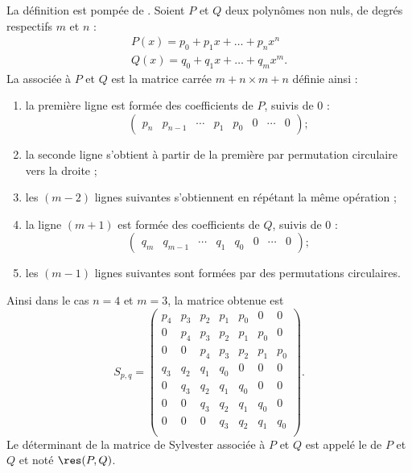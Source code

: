 La définition est pompée de . Soient \( P\) et \( Q\) deux polynômes non nuls, de degrés respectifs \( m\) et \( n\) :
\begin{subequations}
    \begin{align}
        P(x)=p_0+p_1x+\ldots +p_nx^n\\
        Q(x)=q_0+q_1x+\ldots +q_mx^m.
    \end{align}
\end{subequations}
La  associée à \( P\) et \( Q\) est la matrice carrée \( m+n\times m+n\) définie ainsi :
\begin{enumerate}
    \item
la première ligne est formée des coefficients de \( P\), suivis de 0 :
\begin{equation}
\begin{pmatrix} p_n & p_{n-1} & \cdots & p_1 & p_0 & 0 & \cdots & 0 \end{pmatrix} ;
\end{equation}
\item la seconde ligne s'obtient à partir de la première par permutation circulaire vers la droite ;
\item les $(m-2)$ lignes suivantes s'obtiennent en répétant la même opération ;
\item la ligne $(m+1)$ est formée des coefficients de \( Q\), suivis de 0 :
    \begin{equation}
    \begin{pmatrix} q_m & q_{m-1} & \cdots & q_1 & q_0 & 0 & \cdots & 0 \end{pmatrix} ;
    \end{equation}
    \item les $(m-1)$ lignes suivantes sont formées par des permutations circulaires.
\end{enumerate}

Ainsi dans le cas $n=4$ et $m=3$, la matrice obtenue est
\begin{equation}    \label{EqPEgtle}
S_{p,q}=\begin{pmatrix} 
p_4 & p_3 & p_2 & p_1 & p_0 & 0 & 0 \\
0 & p_4 & p_3 & p_2 & p_1 & p_0 & 0 \\
0 & 0 & p_4 & p_3 & p_2 & p_1 & p_0 \\
q_3 & q_2 & q_1 & q_0 & 0 & 0 & 0 \\
0 & q_3 & q_2 & q_1 & q_0 & 0 & 0 \\
0 & 0 & q_3 & q_2 & q_1 & q_0 & 0 \\
0 & 0 & 0 & q_3 & q_2 & q_1 & q_0 \\
\end{pmatrix}.
\end{equation}
Le déterminant de la matrice de Sylvester associée à \( P\) et \( Q\) est appelé le  de \( P\) et \( Q\) et noté \( \res(P,Q)\).

